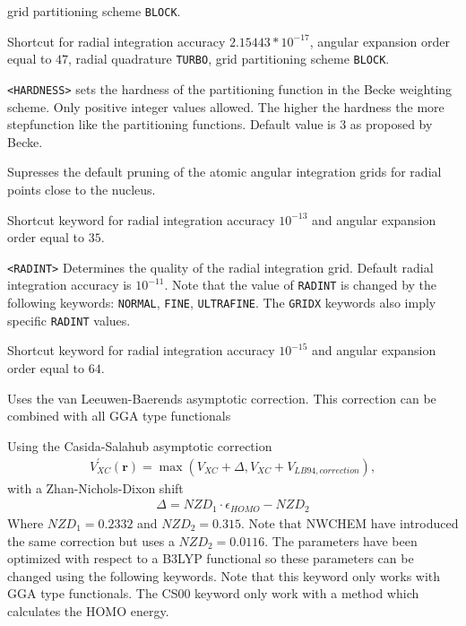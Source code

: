 \begin{description}
grid partitioning scheme \verb|BLOCK|.
\item[\Key{GRID5}]
Shortcut for radial integration accuracy $2.15443*10^{-17}$,
angular expansion order equal to $47$,
radial quadrature \verb|TURBO|,
grid partitioning scheme \verb|BLOCK|.
\item[\Key{HARDNESS}] \verb||\newline
\verb|<HARDNESS>|\newline
sets the hardness of the partitioning function in the Becke weighting scheme. Only positive integer values allowed. 
The higher the hardness the more stepfunction like the partitioning functions. 
Default value is $3$ as proposed by Becke.~\cite{dft-int:becke}
\item[\Key{NOPRUN}]
Supresses the default pruning of the atomic angular integration grids for radial points close to the nucleus. 
\item[\Key{NORMAL}]
Shortcut keyword for radial integration accuracy $10^{-13}$ and angular expansion order equal to $35$.
\item[\Key{RADINT}] \verb||\newline
\verb|<RADINT>|\newline
Determines the quality of the radial integration grid. Default radial integration accuracy is $10^{-11}$.
Note that the value of \verb|RADINT| is changed by the following keywords:
\verb|NORMAL|, \verb|FINE|, \verb|ULTRAFINE|.
The \verb|GRIDX| keywords also imply specific \verb|RADINT| values.
\item[\Key{ULTRAF}]
Shortcut keyword for radial integration accuracy $10^{-15}$ and angular expansion order equal to $64$.
\item[\Key{LB94}] Uses the van Leeuwen-Baerends asymptotic correction. This correction can be combined with all GGA type functionals
\item[\Key{CS00}] Using the Casida-Salahub asymptotic correction\cite{CasidaSalahub} 
\begin{eqnarray}
V^{\prime}_{XC}(\textbf{r}) = \max \left(V_{XC} + \Delta , V_{XC} + V_{LB94,correction}\right),  
\end{eqnarray}
with a Zhan-Nichols-Dixon shift \cite{dixon,ZND}
\begin{eqnarray}
\Delta = NZD_{1} \cdot \epsilon_{HOMO} - NZD_{2}
\end{eqnarray}
Where $NZD_{1} = 0.2332$ and $NZD_{2} = 0.315$. Note that NWCHEM have introduced the same correction but uses a $NZD_{2} = 0.0116$. The parameters have been optimized with respect to a B3LYP functional so these parameters can be changed using the following keywords. Note that this keyword only works with GGA type functionals. The CS00 keyword only work with a method which calculates the HOMO energy.

\end{description}
